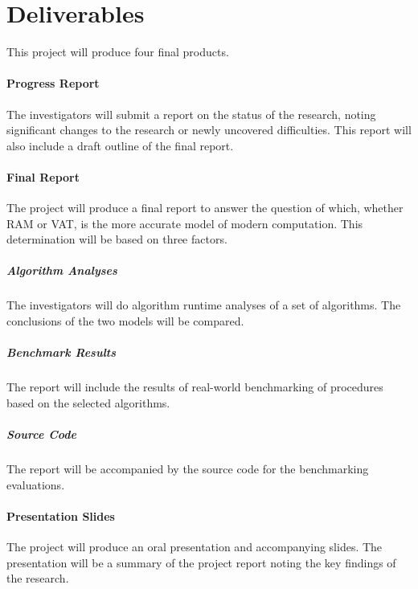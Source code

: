 \section{Deliverables}
  This project will produce four final products.
  \paragraph{Progress Report} The investigators will submit a report on the
  status of the research, noting significant changes to the research or
  newly uncovered difficulties. This report will also include a draft outline
  of the final report.
  \paragraph{Final Report} The project will produce a final report to answer
  the question of which, whether RAM or VAT, is the more accurate model of
  modern computation. This determination will be based on three factors.
    \subparagraph{Algorithm Analyses} The investigators will do algorithm
    runtime analyses of a set of algorithms. The conclusions of the two models
    will be compared.
    \subparagraph{Benchmark Results} The report will include the results of
    real-world benchmarking of procedures based on the selected algorithms.
    \subparagraph{Source Code} The report will be accompanied by the source
    code for the benchmarking evaluations.
  \paragraph{Presentation Slides} The project will produce an oral presentation
  and accompanying slides. The presentation will be a summary of the project
  report noting the key findings of the research.